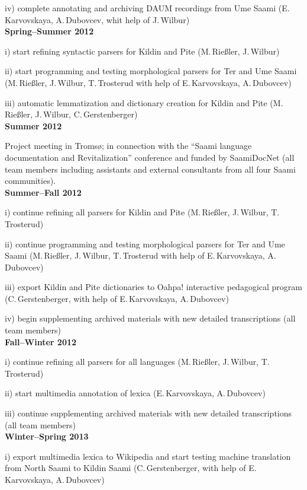 \documentclass[a4paper,12pt]{article}
\begin{document}
{{\begin{flushleft}
iv) complete annotating and archiving DAUM recordings from Ume Saa\-mi (E.\,Karvovskaya, A.\,Dubovcev, whit help of J.\,Wilbur)\\

\noindent \textbf{Spring–Summer 2012}

i) start refining syntactic parsers for Kildin and Pite (M.\,Rießler, J.\,Wilbur)

ii) start programming and testing morphological parsers for Ter and Ume Saami (M.\,Rießler, J.\,Wilbur, T.\,Trosterud with help of E.\,Karvovskaya, A.\,Dubovcev)

iii) automatic lemmatization and dictionary creation for Kildin and Pite (M.\,Rießler, J.\,Wilbur, C.\,Gerstenberger)\\

\noindent \textbf{Summer 2012} 

Project meeting in Tromsø; in connection with the “Saami language documentation and Revitalization” conference and funded by SaamiDocNet (all team members including assistants and external consultants from all four Saami communities).\\

\noindent \textbf{Summer–Fall 2012}

i) continue refining all parsers for Kildin and Pite (M.\,Rießler, J.\,Wilbur, T.\,Trosterud)

ii) continue programming and testing morphological parsers for Ter and Ume Saami (M.\,Rießler, J.\,Wilbur, T.\,Trosterud with help of E.\,Karvovskaya, A.\,Dubovcev)

iii) export Kildin and Pite dictionaries to Oahpa! interactive pedagogical program (C.\,Gerstenberger, with help of E.\,Karvovskaya, A.\,Dubovcev)

iv) begin supplementing archived materials with new detailed transcriptions (all team members)\\

\noindent \textbf{Fall–Winter 2012}

i) continue refining all parsers for all languages (M.\,Rießler, J.\,Wilbur, T.\,Trosterud)

ii) start multimedia annotation of lexica (E.\,Karvovskaya, A.\,Dubovcev)

iii) continue supplementing archived materials with new detailed transcriptions (all team members)\\

\noindent \textbf{Winter–Spring 2013}

i) export multimedia lexica to Wikipedia and start testing machine translation from North Saami to Kildin Saami (C.\,Gerstenberger, with help of E.\,Karvovskaya, A.\,Dubovcev)


\end{flushleft}}}
\end{document}
